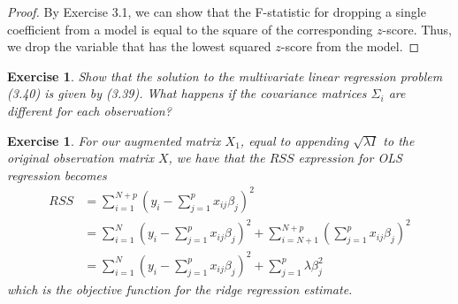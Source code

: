 \documentclass[12pt]{amsart}
\theoremstyle{plain}%
\newtheorem{exer}[thm]{Exercise}
\theoremstyle{definition}
\theoremstyle{remark}
\begin{document}
\begin{proof}
    By Exercise 3.1, we can show that the F-statistic for dropping a single coefficient from a model is equal to the square of the corresponding $z$-score.  Thus, we drop the variable that has the lowest squared $z$-score from the model.
\end{proof}

\begin{exer}
    Show that the solution to the multivariate linear regression problem (3.40) is given by (3.39).  What happens if the covariance matrices $\Sigma_i$ are different for each observation?
\end{exer}


\begin{exer}
    For our augmented matrix $X_1$, equal to appending $\sqrt{\lambda I}$ to the original observation matrix $X$, we have that the $RSS$ expression for OLS regression becomes \begin{align*}
        RSS &= \sum_{i=1}^{N+p} \left(y_i - \sum_{j=1}^p x_{ij} \beta_j \right)^2 \\
            &= \sum_{i=1}^{N} \left( y_i - \sum_{j=1}^p x_{ij} \beta_j \right)^2 + \sum_{i = N + 1}^{N+p} \left(\sum_{j=1}^p x_{ij} \beta_j \right)^2 \\
            &= \sum_{i=1}^{N} \left( y_i - \sum_{j=1}^p x_{ij} \beta_j \right)^2 + \sum_{j=1}^p \lambda \beta_j^2 
    \end{align*} which is the objective function for the ridge regression estimate.
\end{exer}
\end{document}
